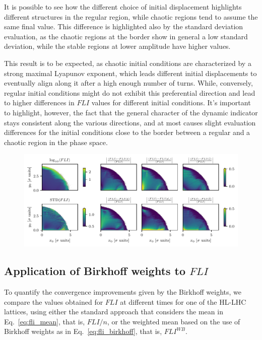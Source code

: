 It is possible to see how the different choice of initial displacement highlights different structures in the regular region, while chaotic regions tend to assume the same final value. This difference is highlighted also by the standard deviation evaluation, as the chaotic regions at the border show in general a low standard deviation, while the stable regions at lower amplitude have higher values.

This result is to be expected, as chaotic initial conditions are characterized by a strong maximal Lyapunov exponent, which leads different initial displacements to eventually align along it after a high enough number of turns. While, conversely, regular initial conditions might do not exhibit this preferential direction and lead to higher differences in $FLI$ values for different initial conditions. It's important to highlight, however, the fact that the general character of the dynamic indicator stays consistent along the various directions, and at most causes slight evaluation differences for the initial conditions close to the border between a regular and a chaotic region in the phase space.

\begin{figure}[htp]
    \centering
    \includegraphics[width=1.0\textwidth]{6_lhc_dynamic_indicators/figs/LE_FLI_high_main_idx_2.pdf}
    \caption{}
    \label{fig:fli_compare}
\end{figure}

\subsection{Application of Birkhoff weights to $FLI$}

To quantify the convergence improvements given by the Birkhoff weights, we compare the values obtained for $FLI$ at different times for one of the HL-LHC lattices, using either the standard approach that considers the mean in Eq.~\eqref{eq:fli_mean}, that is, $FLI/n$, or the weighted mean based on the use of Birkhoff weights as in Eq.~\eqref{eq:fli_birkhoff}, that is, $FLI^{WB}$.

